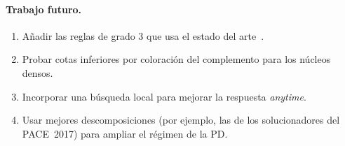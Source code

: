 \paragraph{Trabajo futuro.}
\begin{enumerate}
  \item Añadir las reglas de grado 3 que usa el estado del arte~\citep{akiba2016}.
  \item Probar cotas inferiores por coloración del complemento para los núcleos densos.
  \item Incorporar una búsqueda local para mejorar la respuesta \emph{anytime}.
  \item Usar mejores descomposiciones (por ejemplo, las de los solucionadores del PACE~2017) para ampliar el régimen de la PD.
\end{enumerate}

